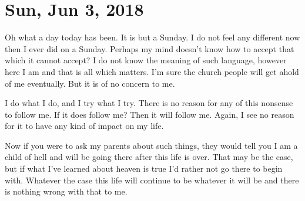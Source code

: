 \section{Sun, Jun 3, 2018}

Oh what a day today has been. It is but a Sunday. I do not feel any different
now then I ever did on a Sunday. Perhaps my mind doesn't know how to accept that
which it cannot accept? I do not know the meaning of such language, however here
I am and that is all which matters. I'm sure the church people will get ahold of
me eventually. But it is of no concern to me.

I do what I do, and I try what I try. There is no reason for any of this
nonsense to follow me. If it does follow me? Then it will follow me. Again, I
see no reason for it to have any kind of impact on my life.

Now if you were to ask my parents about such things, they would tell you I am a
child of hell and will be going there after this life is over. That may be the
case, but if what I've learned about heaven is true I'd rather not go there to
begin with. Whatever the case this life will continue to be whatever it will be
and there is nothing wrong with that to me.
